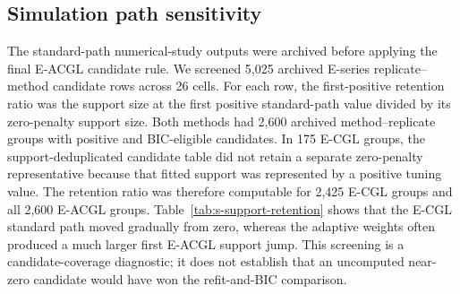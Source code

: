 \documentclass[preprint,12pt,authoryear]{elsarticle}
\begin{document}
\begin{table}[H]
\centering
\scriptsize
\setlength{\tabcolsep}{2.5pt}
\caption{Candidate-path sensitivity of the E-series methods in Classic3.
The final rows use one 240-point path with relative lower endpoint $10^{-4}$;
the other rows record the preceding diagnostics.}
\label{tab:s-classic3-paths}
\end{table}

\subsection{Simulation path sensitivity}

The standard-path numerical-study outputs were archived before applying the
final E-ACGL candidate rule. We screened 5,025
archived E-series replicate--method candidate rows across 26 cells. For each
row, the first-positive retention ratio was the support size at the first
positive standard-path value divided by its zero-penalty support size.
Both methods had 2,600 archived method--replicate groups with positive and
BIC-eligible candidates. In 175 E-CGL groups, the support-deduplicated
candidate table did not retain a separate zero-penalty representative because
that fitted support was represented by a positive tuning value. The retention
ratio was therefore computable for 2,425 E-CGL groups and all 2,600 E-ACGL
groups.
Table~\ref{tab:s-support-retention} shows that the E-CGL standard path moved
gradually from zero, whereas the adaptive weights often produced a much larger
first E-ACGL support jump. This screening is a candidate-coverage diagnostic;
it does not establish that an uncomputed near-zero candidate would have won
the refit-and-BIC comparison.
\end{document}
